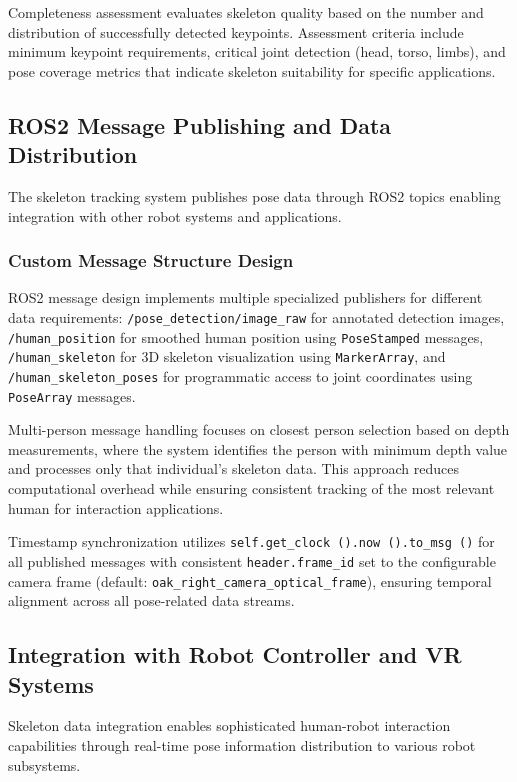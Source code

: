 Completeness assessment evaluates skeleton quality based on the number and distribution of successfully detected keypoints. Assessment criteria include minimum keypoint requirements, critical joint detection (head, torso, limbs), and pose coverage metrics that indicate skeleton suitability for specific applications.

\subsection{ROS2 Message Publishing and Data Distribution}

The skeleton tracking system publishes pose data through ROS2 topics enabling integration with other robot systems and applications.

\subsubsection{Custom Message Structure Design}

ROS2 message design implements multiple specialized publishers for different data requirements: \texttt{/pose\_detection/image\_raw} for annotated detection images, \texttt{/human\_position} for smoothed human position using \texttt{PoseStamped} messages, \texttt{/human\_skeleton} for 3D skeleton visualization using \texttt{MarkerArray}, and \texttt{/human\_skeleton\_poses} for programmatic access to joint coordinates using \texttt{PoseArray} messages.

Multi-person message handling focuses on closest person selection based on depth measurements, where the system identifies the person with minimum depth value and processes only that individual's skeleton data. This approach reduces computational overhead while ensuring consistent tracking of the most relevant human for interaction applications.

Timestamp synchronization utilizes \texttt{self.get\_clock ().now ().to\_msg ()} for all published messages with consistent \texttt{header.frame\_id} set to the configurable camera frame (default: \texttt{oak\_right\_camera\_optical\_frame}), ensuring temporal alignment across all pose-related data streams.

\subsection{Integration with Robot Controller and VR Systems}

Skeleton data integration enables sophisticated human-robot interaction capabilities through real-time pose information distribution to various robot subsystems.

